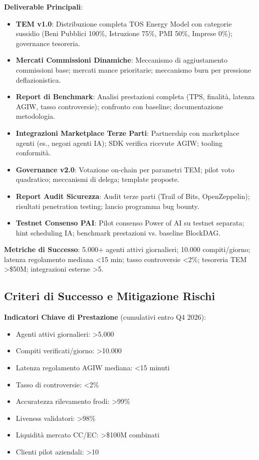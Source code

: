 \documentclass[11pt]{article}
\begin{document}
\begin{itemize}[noitemsep]
\textbf{Deliverable Principali}:
\begin{itemize}[noitemsep]
  \item \textbf{TEM v1.0}: Distribuzione completa TOS Energy Model con categorie sussidio (Beni Pubblici 100\%, Istruzione 75\%, PMI 50\%, Imprese 0\%); governance tesoreria.
  \item \textbf{Mercati Commissioni Dinamiche}: Meccanismo di aggiustamento commissioni base; mercati mance prioritarie; meccanismo burn per pressione deflazionistica.
  \item \textbf{Report di Benchmark}: Analisi prestazioni completa (TPS, finalità, latenza AGIW, tasso controversie); confronto con baseline; documentazione metodologia.
  \item \textbf{Integrazioni Marketplace Terze Parti}: Partnership con marketplace agenti (es., negozi agenti IA); SDK verifica ricevute AGIW; tooling conformità.
  \item \textbf{Governance v2.0}: Votazione on-chain per parametri TEM; pilot voto quadratico; meccanismi di delega; template proposte.
  \item \textbf{Report Audit Sicurezza}: Audit terze parti (Trail of Bits, OpenZeppelin); risultati penetration testing; lancio programma bug bounty.
  \item \textbf{Testnet Consenso PAI}: Pilot consenso Power of AI su testnet separata; hint scheduling IA; benchmark prestazioni vs. baseline BlockDAG.
\end{itemize}

\textbf{Metriche di Successo}: 5.000+ agenti attivi giornalieri; 10.000 compiti/giorno; latenza regolamento mediana <15 min; tasso controversie <2\%; tesoreria TEM >\$50M; integrazioni esterne >5.

\subsection{Criteri di Successo e Mitigazione Rischi}

\textbf{Indicatori Chiave di Prestazione} (cumulativi entro Q4 2026):
\begin{itemize}[noitemsep]
  \item Agenti attivi giornalieri: >5.000
  \item Compiti verificati/giorno: >10.000
  \item Latenza regolamento AGIW mediana: <15 minuti
  \item Tasso di controversie: <2\%
  \item Accuratezza rilevamento frodi: >99\%
  \item Liveness validatori: >98\%
  \item Liquidità mercato CC/EC: >\$100M combinati
  \item Clienti pilot aziendali: >10
\end{itemize}


\end{itemize}
\end{document}
